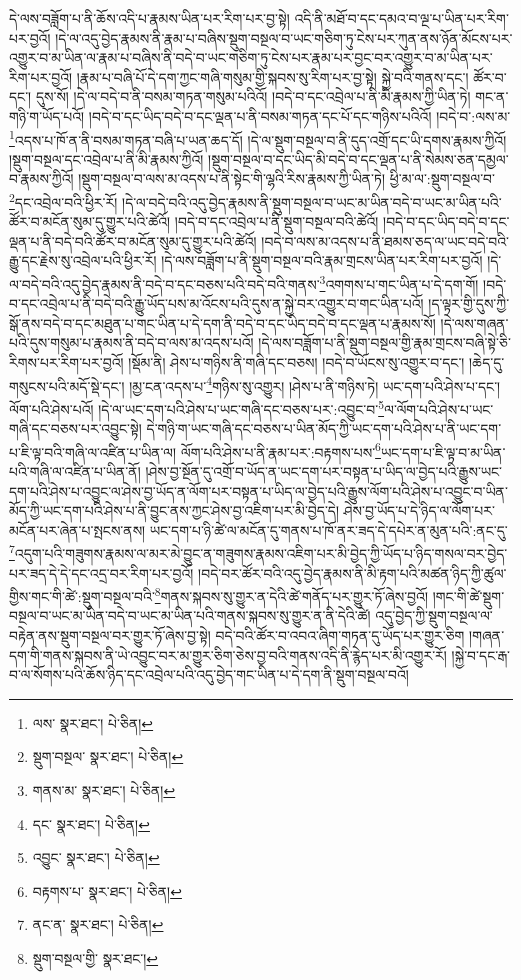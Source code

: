 དེ་ལས་བཟློག་པ་ནི་ཆོས་འདི་པ་རྣམས་ཡིན་པར་རིག་པར་བྱ་སྟེ། འདི་ནི་མཐོ་བ་དང་དམའ་བ་ལྔ་པ་ཡིན་པར་རིག་པར་བྱའོ། །དེ་ལ་འདུ་བྱེད་རྣམས་ནི་རྣམ་པ་བཞིས་སྡུག་བསྔལ་བ་ཡང་གཅིག་ཏུ་ངེས་པར་ཀུན་ནས་ཉོན་མོངས་པར་འགྱུར་བ་མ་ཡིན་ལ་རྣམ་པ་བཞིས་ནི་བདེ་བ་ཡང་གཅིག་ཏུ་ངེས་པར་རྣམ་པར་བྱང་བར་འགྱུར་བ་མ་ཡིན་པར་རིག་པར་བྱའོ། །རྣམ་པ་བཞི་པོ་དེ་དག་ཀྱང་གཞི་གསུམ་གྱི་སྐབས་སུ་རིག་པར་བྱ་སྟེ། སྐྱེ་བའི་གནས་དང་། ཚོར་བ་དང་། དུས་སོ། །དེ་ལ་བདེ་བ་ནི་བསམ་གཏན་གསུམ་པའིའོ། །བདེ་བ་དང་འབྲེལ་པ་ནི་མི་རྣམས་ཀྱི་ཡིན་ཏེ། གང་ན་གཉི་ག་ཡོད་པའོ། །བདེ་བ་དང་ཡིད་བདེ་བ་དང་ལྡན་པ་ནི་བསམ་གཏན་དང་པོ་དང་གཉིས་པའིའོ། །བདེ་བ་:ལས་མ་\footnote{ལས་  སྣར་ཐང་།  པེ་ཅིན། }འདས་པ་ཁོ་ན་ནི་བསམ་གཏན་བཞི་པ་ཡན་ཆད་དོ། །དེ་ལ་སྡུག་བསྔལ་བ་ནི་དུད་འགྲོ་དང་ཡི་དགས་རྣམས་ཀྱིའོ། །སྡུག་བསྔལ་དང་འབྲེལ་པ་ནི་མི་རྣམས་ཀྱིའོ། །སྡུག་བསྔལ་བ་དང་ཡིད་མི་བདེ་བ་དང་ལྡན་པ་ནི་སེམས་ཅན་དམྱལ་བ་རྣམས་ཀྱིའོ། །སྡུག་བསྔལ་བ་ལས་མ་འདས་པ་ནི་སྟེང་གི་ལྷའི་རིས་རྣམས་ཀྱི་ཡིན་ཏེ། ཕྱི་མ་ལ་:སྡུག་བསྔལ་བ་\footnote{སྡུག་བསྔལ་  སྣར་ཐང་།  པེ་ཅིན། }དང་འབྲེལ་བའི་ཕྱིར་རོ། །དེ་ལ་བདེ་བའི་འདུ་བྱེད་རྣམས་ནི་སྡུག་བསྔལ་བ་ཡང་མ་ཡིན་བདེ་བ་ཡང་མ་ཡིན་པའི་ཚོར་བ་མངོན་སུམ་དུ་གྱུར་པའི་ཚེའོ། །བདེ་བ་དང་འབྲེལ་པ་ནི་སྡུག་བསྔལ་བའི་ཚེའོ། །བདེ་བ་དང་ཡིད་བདེ་བ་དང་ལྡན་པ་ནི་བདེ་བའི་ཚོར་བ་མངོན་སུམ་དུ་གྱུར་པའི་ཚེའོ། །བདེ་བ་ལས་མ་འདས་པ་ནི་ཐམས་ཅད་ལ་ཡང་བདེ་བའི་རྒྱུ་དང་རྗེས་སུ་འབྲེལ་པའི་ཕྱིར་རོ། །དེ་ལས་བཟློག་པ་ནི་སྡུག་བསྔལ་བའི་རྣམ་གྲངས་ཡིན་པར་རིག་པར་བྱའོ། །དེ་ལ་བདེ་བའི་འདུ་བྱེད་རྣམས་ནི་བདེ་བ་དང་བཅས་པའི་བདེ་བའི་གནས་\footnote{གནས་མ་  སྣར་ཐང་།  པེ་ཅིན། }འགགས་པ་གང་ཡིན་པ་དེ་དག་གོ། །བདེ་བ་དང་འབྲེལ་པ་ནི་བདེ་བའི་རྒྱུ་ཡོད་པས་མ་འོངས་པའི་དུས་ན་སྐྱེ་བར་འགྱུར་བ་གང་ཡིན་པའོ། །ད་ལྟར་གྱི་དུས་ཀྱི་སྒོ་ནས་བདེ་བ་དང་མཐུན་པ་གང་ཡིན་པ་དེ་དག་ནི་བདེ་བ་དང་ཡིད་བདེ་བ་དང་ལྡན་པ་རྣམས་སོ། །དེ་ལས་གཞན་པའི་དུས་གསུམ་པ་རྣམས་ནི་བདེ་བ་ལས་མ་འདས་པའོ། །དེ་ལས་བཟློག་པ་ནི་སྡུག་བསྔལ་གྱི་རྣམ་གྲངས་བཞི་སྟེ་ཅི་རིགས་པར་རིག་པར་བྱའོ། །སྡོམ་ནི། ཤེས་པ་གཉིས་ནི་གཞི་དང་བཅས། །བདེ་བ་ཡོངས་སུ་འགྱུར་བ་དང་། །ཆེད་དུ་གསུངས་པའི་མདོ་སྡེ་དང་། །མྱ་ངན་འདས་པ་\footnote{དང་  སྣར་ཐང་།  པེ་ཅིན། }གཉིས་སུ་འགྱུར། །ཤེས་པ་ནི་གཉིས་ཏེ། ཡང་དག་པའི་ཤེས་པ་དང་། ལོག་པའི་ཤེས་པའོ། །དེ་ལ་ཡང་དག་པའི་ཤེས་པ་ཡང་གཞི་དང་བཅས་པར་:འབྱུང་བ་\footnote{འབྱུང་  སྣར་ཐང་།  པེ་ཅིན། }ལ་ལོག་པའི་ཤེས་པ་ཡང་གཞི་དང་བཅས་པར་འབྱུང་སྟེ། དེ་གཉི་ག་ཡང་གཞི་དང་བཅས་པ་ཡིན་མོད་ཀྱི་ཡང་དག་པའི་ཤེས་པ་ནི་ཡང་དག་པ་ཇི་ལྟ་བའི་གཞི་ལ་འཛིན་པ་ཡིན་ལ། ལོག་པའི་ཤེས་པ་ནི་རྣམ་པར་:བརྟགས་པས་\footnote{བརྟགས་པ་  སྣར་ཐང་།  པེ་ཅིན། }ཡང་དག་པ་ཇི་ལྟ་བ་མ་ཡིན་པའི་གཞི་ལ་འཛིན་པ་ཡིན་ནོ། །ཤེས་བྱ་སྔོན་དུ་འགྲོ་བ་ཡོད་ན་ཡང་དག་པར་བསྟན་པ་ཡིད་ལ་བྱེད་པའི་རྒྱུས་ཡང་དག་པའི་ཤེས་པ་འབྱུང་ལ་ཤེས་བྱ་ཡོད་ན་ལོག་པར་བསྟན་པ་ཡིད་ལ་བྱེད་པའི་རྒྱུས་ལོག་པའི་ཤེས་པ་འབྱུང་བ་ཡིན་མོད་ཀྱི་ཡང་དག་པའི་ཤེས་པ་ནི་བྱུང་ནས་ཀྱང་ཤེས་བྱ་འཇིག་པར་མི་བྱེད་དེ། ཤེས་བྱ་ཡོད་པ་དེ་ཉིད་ལ་ལོག་པར་མངོན་པར་ཞེན་པ་སྤངས་ནས། ཡང་དག་པ་ཉི་ཚེ་ལ་མངོན་དུ་གནས་པ་ཁོ་ནར་ཟད་དེ་དཔེར་ན་མུན་པའི་:ནང་དུ་\footnote{ནང་ན་  སྣར་ཐང་།  པེ་ཅིན། }འདུག་པའི་གཟུགས་རྣམས་ལ་མར་མེ་བྱུང་ན་གཟུགས་རྣམས་འཇིག་པར་མི་བྱེད་ཀྱི་ཡོད་པ་ཉིད་གསལ་བར་བྱེད་པར་ཟད་དེ་དེ་དང་འདྲ་བར་རིག་པར་བྱའོ། །བདེ་བར་ཚོར་བའི་འདུ་བྱེད་རྣམས་ནི་མི་རྟག་པའི་མཚན་ཉིད་ཀྱི་ཚུལ་གྱིས་གང་གི་ཚེ་:སྡུག་བསྔལ་བའི་\footnote{སྡུག་བསྔལ་གྱི་  སྣར་ཐང་། }གནས་སྐབས་སུ་གྱུར་ན་དེའི་ཚེ་གནོད་པར་གྱུར་ཏོ་ཞེས་བྱའོ། །གང་གི་ཚེ་སྡུག་བསྔལ་བ་ཡང་མ་ཡིན་བདེ་བ་ཡང་མ་ཡིན་པའི་གནས་སྐབས་སུ་གྱུར་ན་ནི་དེའི་ཚེ། འདུ་བྱེད་ཀྱི་སྡུག་བསྔལ་ལ་བརྟེན་ནས་སྡུག་བསྔལ་བར་གྱུར་ཏོ་ཞེས་བྱ་སྟེ། བདེ་བའི་ཚོར་བ་འབའ་ཞིག་གཏན་དུ་ཡོད་པར་གྱུར་ཅིག །གཞན་དག་གི་གནས་སྐབས་ནི་ཡེ་འབྱུང་བར་མ་གྱུར་ཅིག་ཅེས་བྱ་བའི་གནས་འདི་ནི་རྙེད་པར་མི་འགྱུར་རོ། །སྐྱེ་བ་དང་རྒ་བ་ལ་སོགས་པའི་ཆོས་ཉིད་དང་འབྲེལ་པའི་འདུ་བྱེད་གང་ཡིན་པ་དེ་དག་ནི་སྡུག་བསྔལ་བའོ། 